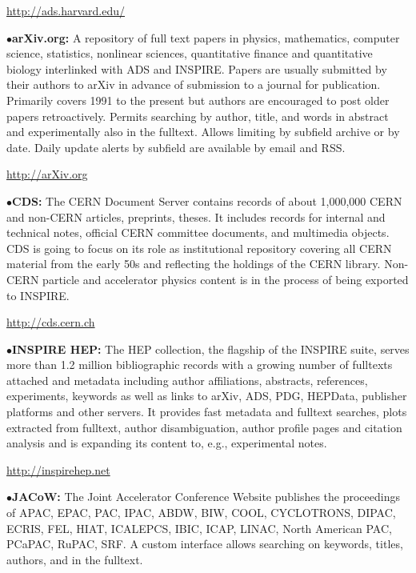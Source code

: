        \item{}\qquad\url{http://ads.harvard.edu/}

\medskip

\item{$\bullet$}{\bf arXiv.org:}
A repository of full text papers in physics, mathematics, computer science, statistics, nonlinear sciences, quantitative finance and quantitative biology interlinked with ADS and INSPIRE. Papers are usually submitted by their authors to arXiv in advance of submission to a journal for publication. Primarily covers 1991 to the present but authors are encouraged to post older papers retroactively. Permits searching by author, title, and words in abstract and experimentally also in the fulltext. Allows limiting by subfield archive or by date. Daily update alerts by subfield are available by email and RSS.

	\item{}\qquad\url{http://arXiv.org}
\medskip

\item{$\bullet$}{\bf CDS:}
The CERN Document Server contains records of about 1,000,000 CERN and non-CERN articles, preprints, theses. It includes records for internal and technical notes, official CERN committee documents, and multimedia objects. CDS is going to focus on its role as institutional repository covering all CERN material from the early 50s and reflecting the holdings of the CERN library. Non-CERN particle and accelerator physics content is in the process of being exported to INSPIRE.

      \item{}\qquad\url{http://cds.cern.ch}
\medskip

\item{$\bullet$}{\bf INSPIRE HEP:} 
The HEP collection, the flagship of the INSPIRE suite, serves more than 1.2 million bibliographic records with a growing number of fulltexts attached and metadata including author affiliations, abstracts, references, experiments, keywords as well as links to arXiv, ADS, PDG, HEPData, publisher platforms and other servers. It provides fast metadata and fulltext searches, plots extracted from fulltext, author disambiguation, author profile pages and citation analysis and is expanding its content to, e.g., experimental notes.

   \item{}\qquad\url{http://inspirehep.net}
\medskip


\item{$\bullet$}{\bf JACoW:}
The Joint Accelerator Conference Website publishes the proceedings of APAC, EPAC, PAC, IPAC, ABDW, BIW, COOL, CYCLOTRONS, DIPAC, ECRIS, FEL, HIAT, ICALEPCS, IBIC, ICAP, LINAC, North American PAC, PCaPAC, RuPAC, SRF. A custom interface allows searching on keywords, titles, authors, and in the fulltext.

